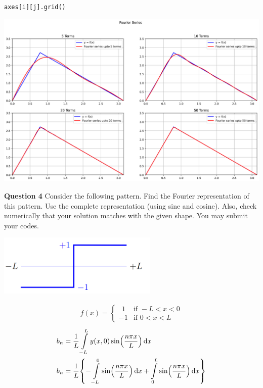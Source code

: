 \documentclass[addpoints]{exam}
\begin{document}
\begin{questions}
\begin{solution}
\begin{lstlisting}[language = Python]
                axes[i][j].grid()
    \end{lstlisting}
    \includegraphics[width = 6.0in]{output_6_0.png}
\end{solution}
\newpage
\question \textbf{ Question 4}
Consider the following pattern. Find the Fourier representation of this pattern. Use the
complete representation (using sine and cosine). Also, check numerically that your solution
matches with the given shape. You may submit your codes.\\
\begin{center}
    \includegraphics[width = 3.0in]{q4.png}
\end{center}
\begin{solution}
    \begin{align*}
        f(x) =
        \begin{cases}
            ~\ 1 & \text{if } -L<x<0 \\
            -1 & \text{if } 0<x<L
        \end{cases}
    \end{align*}
    \begin{align*}
        b_n & = \frac{1}{L} \int \limits_{-L}^{L} y(x, 0) \sin(\frac{n \pi x}{L}) \dd{x}                                                                            \\
        b_n & = \frac{1}{L} \qty{- \int \limits_{-L}^{0} \sin(\frac{n \pi x}{L}) \dd{x} + \int \limits_{0}^{L} \sin(\frac{n \pi x}{L}) \dd{x}}                      \\

\end{align*}
\end{solution}
\end{questions}
\end{document}
